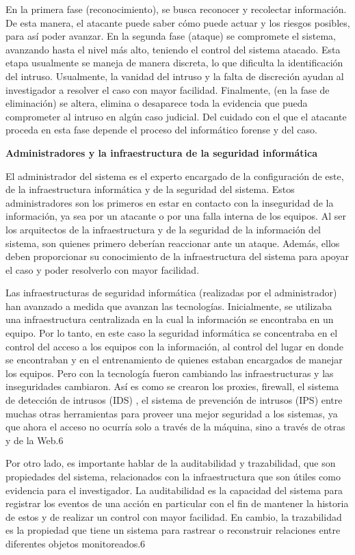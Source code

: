 En la primera fase (reconocimiento), se busca reconocer y recolectar información. De esta manera, el atacante puede saber cómo puede actuar y los riesgos posibles, para así poder avanzar. En la segunda fase (ataque) se compromete el sistema, avanzando hasta el nivel más alto, teniendo el control del sistema atacado. Esta etapa usualmente se maneja de manera discreta, lo que dificulta la identificación del intruso. Usualmente, la vanidad del intruso y la falta de discreción ayudan al investigador a resolver el caso con mayor facilidad. Finalmente, (en la fase de eliminación) se altera, elimina o desaparece toda la evidencia que pueda comprometer al intruso en algún caso judicial. Del cuidado con el que el atacante proceda en esta fase depende el proceso del informático forense y del caso.

\textbf{Administradores y la infraestructura de la seguridad informática}

El administrador del sistema es el experto encargado de la configuración de este, de la infraestructura informática y de la seguridad del sistema. Estos administradores son los primeros en estar en contacto con la inseguridad de la información, ya sea por un atacante o por una falla interna de los equipos. Al ser los arquitectos de la infraestructura y de la seguridad de la información del sistema, son quienes primero deberían reaccionar ante un ataque. Además, ellos deben proporcionar su conocimiento de la infraestructura del sistema para apoyar el caso y poder resolverlo con mayor facilidad.

Las infraestructuras de seguridad informática (realizadas por el administrador) han avanzado a medida que avanzan las tecnologías. Inicialmente, se utilizaba una infraestructura centralizada en la cual la información se encontraba en un equipo. Por lo tanto, en este caso la seguridad informática se concentraba en el control del acceso a los equipos con la información, al control del lugar en donde se encontraban y en el entrenamiento de quienes estaban encargados de manejar los equipos. Pero con la tecnología fueron cambiando las infraestructuras y las inseguridades cambiaron. Así es como se crearon los proxies, firewall, el sistema de detección de intrusos (IDS) , el sistema de prevención de intrusos (IPS) entre muchas otras herramientas para proveer una mejor seguridad a los sistemas, ya que ahora el acceso no ocurría solo a través de la máquina, sino a través de otras y de la Web.6

Por otro lado, es importante hablar de la auditabilidad y trazabilidad, que son propiedades del sistema, relacionados con la infraestructura que son útiles como evidencia para el investigador. La auditabilidad es la capacidad del sistema para registrar los eventos de una acción en particular con el fin de mantener la historia de estos y de realizar un control con mayor facilidad. En cambio, la trazabilidad es la propiedad que tiene un sistema para rastrear o reconstruir relaciones entre diferentes objetos monitoreados.6

